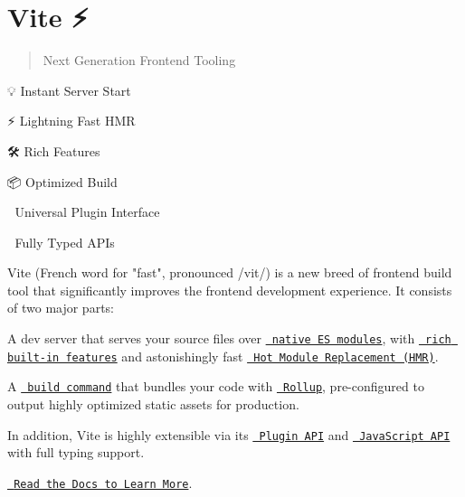 \chapter{Vite ⚡}
\hypertarget{md__project5___h_r_2_project5___h_r___front___end_2node__modules_2vite_2_r_e_a_d_m_e}{}\label{md__project5___h_r_2_project5___h_r___front___end_2node__modules_2vite_2_r_e_a_d_m_e}
\label{md__project5___h_r_2_project5___h_r___front___end_2node__modules_2vite_2_r_e_a_d_m_e_autotoc_md3382}%
%
 \begin{quote}
Next Generation Frontend Tooling \end{quote}

\begin{DoxyItemize}
\item 💡 Instant Server Start
\item ⚡️ Lightning Fast HMR
\item 🛠️ Rich Features
\item 📦 Optimized Build
\item 🔩 Universal Plugin Interface
\item 🔑 Fully Typed APIs
\end{DoxyItemize}

Vite (French word for "{}fast"{}, pronounced {\ttfamily /vit/}) is a new breed of frontend build tool that significantly improves the frontend development experience. It consists of two major parts\+:


\begin{DoxyItemize}
\item A dev server that serves your source files over \href{https://developer.mozilla.org/en-US/docs/Web/JavaScript/Guide/Modules}{\texttt{ native ES modules}}, with \href{https://vite.dev/guide/features.html}{\texttt{ rich built-\/in features}} and astonishingly fast \href{https://vite.dev/guide/features.html\#hot-module-replacement}{\texttt{ Hot Module Replacement (HMR)}}.
\item A \href{https://vite.dev/guide/build.html}{\texttt{ build command}} that bundles your code with \href{https://rollupjs.org}{\texttt{ Rollup}}, pre-\/configured to output highly optimized static assets for production.
\end{DoxyItemize}

In addition, Vite is highly extensible via its \href{https://vite.dev/guide/api-plugin.html}{\texttt{ Plugin API}} and \href{https://vite.dev/guide/api-javascript.html}{\texttt{ Java\+Script API}} with full typing support.

\href{https://vite.dev}{\texttt{ Read the Docs to Learn More}}. 